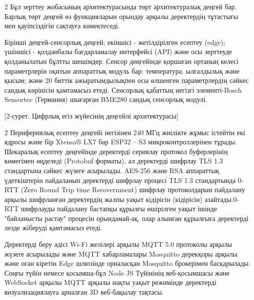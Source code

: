 \begin{multicols}{2}
Бұл зерттеу жобасының архитектурасында төрт архитектуралық деңгей бар.
Барлық төрт деңгей өз функцияларын орындау арқылы деректердің тұтастығы
мен қауіпсіздігін сақтауға көмектеседі.

Бірінші деңгей-сенсорлық деңгей; екіншісі - жетілдірілген есептеу
(edge); үшіншісі - қолданбалы бағдарламалау интерфейсі (API) және осы
зерттеуде қолданылатын бұлтты шешімдер. Сенсор деңгейінде қоршаған
ортаның келесі параметрлерін оқитын аппараттық модуль бар: температура,
ылғалдылық және қысым; және 20 биттік ажыратымдылықпен осы өлшенген
параметрлердің сәйкес сандық көрінісін қамтамасыз етеді. Сенсорлық
қабаттың негізгі элементі-Bosch Sensortec (Германия) шығарған BME280
сандық сенсорлық модулі.
\end{multicols}

[2-сурет. Цифрлық егіз жүйесінің деңгейлі архитектурасы]

\begin{multicols}{2}
Перифериялық есептеу деңгейі негізінен 240 МГц жиілікте жұмыс істейтін
екі ядросы және бір Xtensa® LX7 бар ESP32 -- S3 микроконтроллерінен
тұрады. Шекаралық есептеу деңгейінде деректерді сериялау протокол
буферлерінің көмегімен өңделеді (Protobuf форматы), ал деректерді
шифрлау TLS 1.3 стандартына сәйкес жүзеге асырылады. AES-256 және RSA
аппараттық үдеткіштерін пайдаланып деректерді шифрлау процесі TLS 1.3
стандартында 0-RTT (Zero Round Trip time Recovernment) шифрлау
протоколдарын пайдалану арқылы шифрланған деректердің жалпы уақыт
кідірісін (кідірісін) азайтады.0-RTT шифрлауды пайдалану бастапқы
құрылғы өшірілген уақыт ішінде "байланысты растау" процесін
орындамай-ақ, олар алынған құрылғыға деректерді лезде жіберуді
қамтамасыз етеді.

Деректерді беру әдісі Wi-Fi желілері арқылы MQTT 5.0 протоколы арқылы
жүзеге асырылады және MQTT хабарламалары Mosquitto дерекқоры арқылы және
оған кіретін Edge шлюзінде орналасқан Mosquitto брокерімен басқарылады.
Соңғы түйін немесе қосымша-бұл Node JS Түйінінің веб-қосымшасы және
WebSocket арқылы MQTT арқылы нақты уақыт режимінде деректерді
визуализациялауға арналған 3D веб-бақылау тақтасы.
\end{multicols}


